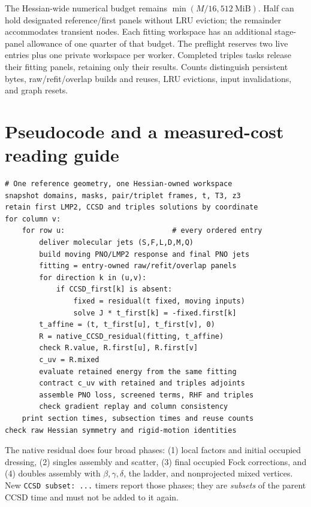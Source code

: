 \documentclass[10pt,letterpaper]{article}
\newcommand{\sectionpage}[1]{\newpage\section{#1}}
\begin{document}
The Hessian-wide numerical budget remains $\min(M/16,512\ \mathrm{MiB})$. Half can hold designated reference/first panels without LRU eviction; the remainder accommodates transient nodes. Each fitting workspace has an additional stage-panel allowance of one quarter of that budget. The preflight reserves two live entries plus one private workspace per worker. Completed triples tasks release their fitting panels, retaining only their results. Counts distinguish persistent bytes, raw/refit/overlap builds and reuses, LRU evictions, input invalidations, and graph resets.

\sectionpage{Pseudocode and a measured-cost reading guide}
\begin{lstlisting}
# One reference geometry, one Hessian-owned workspace
snapshot domains, masks, pair/triplet frames, t, T3, z3
retain first LMP2, CCSD and triples solutions by coordinate
for column v:
    for row u:                         # every ordered entry
        deliver molecular jets (S,F,L,D,M,Q)
        build moving PNO/LMP2 response and final PNO jets
        fitting = entry-owned raw/refit/overlap panels
        for direction k in (u,v):
            if CCSD_first[k] is absent:
                fixed = residual(t fixed, moving inputs)
                solve J * t_first[k] = -fixed.first[k]
        t_affine = (t, t_first[u], t_first[v], 0)
        R = native_CCSD_residual(fitting, t_affine)
        check R.value, R.first[u], R.first[v]
        c_uv = R.mixed
        evaluate retained energy from the same fitting
        contract c_uv with retained and triples adjoints
        assemble PNO loss, screened terms, RHF and triples
        check gradient replay and column consistency
    print section times, subsection times and reuse counts
check raw Hessian symmetry and rigid-motion identities
\end{lstlisting}
The native residual does four broad phases: (1) local factors and initial occupied dressing, (2) singles assembly and scatter, (3) final occupied Fock corrections, and (4) doubles assembly with $\beta,\gamma,\delta$, the ladder, and nonprojected mixed vertices. New \texttt{CCSD subset: ...} timers report those phases; they are \emph{subsets} of the parent CCSD time and must not be added to it again.
\end{document}
